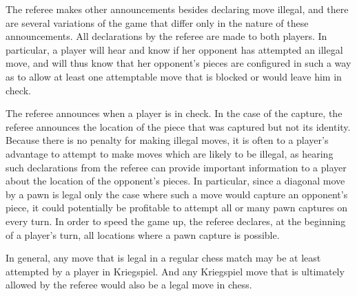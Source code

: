 \documentclass[times, 10pt,twocolumn]{article}
\begin{document}
The referee makes other announcements besides declaring move illegal, and there
are several variations of the game that differ only in the nature of these
announcements.  All declarations by the referee are made to both players.  In
particular, a player will hear and know if her opponent has attempted an
illegal move, and will thus know that her opponent's pieces are configured in
such a way as to allow at least one attemptable move that is blocked or would
leave him in check.  

The referee announces when a player is in check. In the case of the capture,
the referee announces the location of the piece that was captured but not its
identity.  Because there is no penalty for making illegal moves, it is often to
a player's advantage to attempt to make moves which are likely to be illegal,
as hearing such declarations from the referee can provide important information
to a player about the location of the opponent's pieces.  In particular, since
a diagonal move by a pawn is legal only the case where such a move would
capture an opponent's piece, it could potentially be profitable to attempt all
or many pawn captures on every turn.  In order to speed the game up, the
referee declares, at the beginning of a player's turn, all locations where a
pawn capture is possible. 

In general, any move that is legal in a regular chess match may be at least
attempted by a player in Kriegspiel.  And any Kriegspiel move that is
ultimately allowed by the referee would also be a legal move in chess.    
\end{document}
